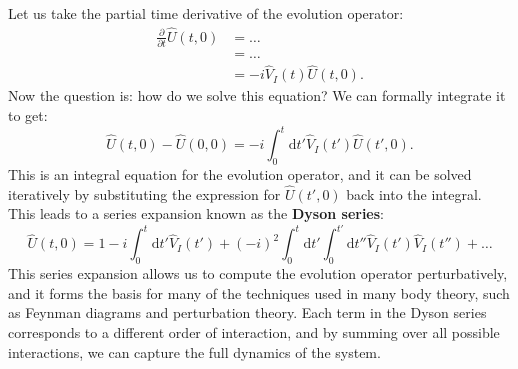 Let us take the partial time derivative of the evolution operator:
\[
    \begin{aligned}
        \frac{\partial}{\partial t} \hat{U}(t,0) & = \dots                         \\
                                                 & = \dots                         \\
                                                 & = -i \hat{V}_I(t) \hat{U}(t,0).
    \end{aligned}
\]
Now the question is: how do we solve this equation? We can formally integrate it to get:
\[
    \hat{U}(t,0) - \hat{U}(0,0) = - i \int_0^t \mathrm{d} t' \hat{V}_I(t') \hat{U}(t',0).
\]
This is an integral equation for the evolution operator, and it can be solved iteratively by substituting the expression for \(\hat{U}(t',0)\) back into the integral. This leads to a series expansion known as the \textbf{Dyson series}:
\[
    \hat{U}(t,0) = 1 - i \int_0^t \mathrm{d} t' \hat{V}_I(t') + (-i)^2 \int_0^t \mathrm{d} t' \int_0^{t'} \mathrm{d} t'' \hat{V}_I(t') \hat{V}_I(t'') + \dots
\]
This series expansion allows us to compute the evolution operator perturbatively, and it forms the basis for many of the techniques used in many body theory, such as Feynman diagrams and perturbation theory. Each term in the Dyson series corresponds to a different order of interaction, and by summing over all possible interactions, we can capture the full dynamics of the system.

